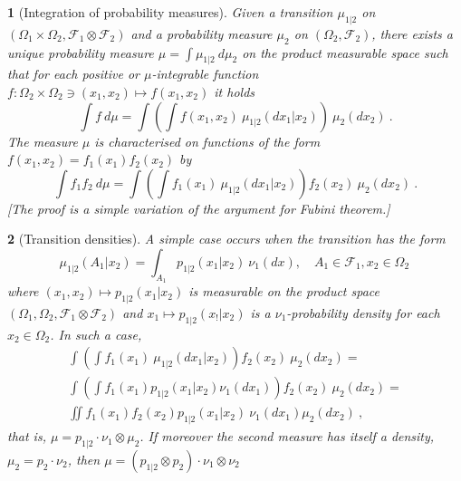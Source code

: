\documentclass[12pt,a4paper]{amsart}
\theoremstyle{plain}%
\newtheorem{npar}{}%
\theoremstyle{definition}
\theoremstyle{remark}
\begin{document}
\begin{npar}[Integration of probability measures] \normalfont
Given a transition $\mu_{1|2}$ on $(\Omega_1\times\Omega_2, \mathcal F_1 \otimes \mathcal F_2)$ and a probability measure $\mu_2$ on $(\Omega_2,\mathcal F_2)$, there exists a unique probability measure $\mu = \int \mu_{1|2} \ d\mu_2$ on the product measurable space such that for each positive or $\mu$-integrable function $f \colon \Omega_2\times\Omega_2 \ni (x_1,x_2) \mapsto f(x_1,x_2)$ it holds
\begin{equation*}
  \int f \ d\mu = \int \left(\int f(x_1,x_2) \ \mu_{1|2}(dx_1|x_2)\right) \ \mu_2(dx_2) \ .
\end{equation*}
The measure $\mu$ is characterised on functions of the form $f(x_1,x_2) = f_1(x_1)f_2(x_2)$ by 
\begin{equation*}
  \int f_1f_2 \ d\mu = \int \left(\int f_1(x_1) \ \mu_{1|2}(dx_1|x_2)\right)f_2(x_2) \ \mu_2(dx_2) \ .
\end{equation*}
[The proof is a simple variation of the argument for Fubini theorem.]
\end{npar}

\begin{npar}[Transition densities] \normalfont A simple case occurs when the transition has the form
\begin{equation*}
  \mu_{1|2}(A_1|x_2) = \int_{A_1} p_{1|2}(x_1|x_2) \ \nu_1(dx), \quad A_1 \in \mathcal F_1, x_2 \in \Omega_2 \,
\end{equation*}
where $(x_1,x_2) \mapsto p_{1|2}(x_1|x_2)$ is measurable on the product space $(\Omega_1,\Omega_2, \mathcal F_1 \otimes \mathcal F_2)$ and $x_1 \mapsto p_{1|2}(x_!|x_2)$ is a $\nu_1$-probability density for each $x_2 \in \Omega_2$. In such a case,  
\begin{multline*}
\int \left(\int f_1(x_1) \ \mu_{1|2}(dx_1|x_2)\right)f_2(x_2) \ \mu_2(dx_2) = \\ \int \left(\int f_1(x_1) p_{1|2}(x_1|x_2) \nu_1(dx_1)\right)f_2(x_2) \ \mu_2(dx_2) = \\ \iint f_1(x_1)f_2(x_2) p_{1|2}(x_1|x_2) \ \nu_1(dx_1) \mu_2(dx_2) \ ,
\end{multline*}
that is, $\mu = p_{1|2} \cdot \nu_1 \otimes \mu_2$. If moreover the second measure has itself a density, $\mu_2 = p_2 \cdot \nu_2$, then $\mu = (p_{1|2} \otimes p_2) \cdot \nu_1 \otimes \nu_2$  
\end{npar}
\end{document}
